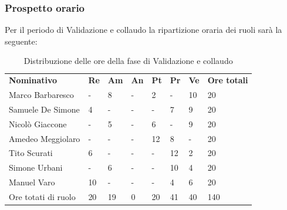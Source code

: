     \subsubsection{Prospetto orario}
    Per il periodo di Validazione e collaudo la ripartizione oraria dei ruoli sarà la seguente:
        \begin{center}
            \begin{table}[ht!]
                \centering
                \caption{Distribuzione delle ore della fase di Validazione e collaudo}
                \vspace{5px}
                \renewcommand{\arraystretch}{1.8}
                \begin{tabular}{p{100px} p{20px} p{20px} p{20px} p{20px} p{20px} p{20px} p{50px} }
                    \rowcolor{logo!70} \textbf{Nominativo} & \textbf{Re} & \textbf{Am} & \textbf{An} & \textbf{Pt} & \textbf{Pr} & \textbf{Ve} & \textbf{Ore totali}\\
                    Marco Barbaresco & - & 8 & - & 2 & - & 10 & 20\\
                    Samuele De Simone & 4 & - & - & - & 7 & 9 & 20\\
                    Nicolò Giaccone & - & 5 & - & 6 & - & 9 & 20\\
                    Amedeo Meggiolaro & - & - & - & 12 & 8 & - & 20\\
                    Tito Scurati & 6 & - & - & - & 12 & 2 & 20\\
                    Simone Urbani & - & 6 & - & - & 10 & 4 & 20\\
                    Manuel Varo & 10 & - & - & - & 4 & 6 & 20\\
                    Ore totati di ruolo & 20 & 19 & 0 & 20 & 41 & 40 & 140\\
                \end{tabular}
            \end{table}
        \end{center}
        \pagebreak

